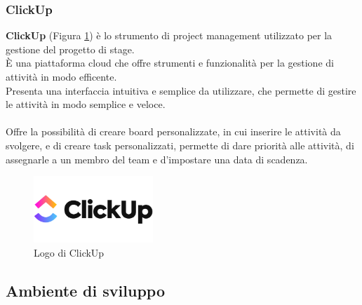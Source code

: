 \subsubsection{ClickUp}   %
\textbf{ClickUp} (Figura \ref{fig:clickup}) è lo strumento di project management utilizzato per la gestione del progetto di stage.\\ 
È una piattaforma cloud che offre strumenti e funzionalità per la gestione di attività in modo efficente.\\
Presenta una interfaccia intuitiva e semplice da utilizzare, che permette di gestire le attività in modo semplice e veloce.\\
\pagebreak
\\
Offre la possibilità di creare \gls{board}{} personalizzate, in cui inserire le attività da svolgere, e di creare \gls{task}{} personalizzati,
permette di dare priorità alle attività, di assegnarle a un membro del team e d'impostare una data di scadenza.\\

\begin{figure}[h]
    \centering
    \includegraphics[width=0.4\textwidth]{images/tecnologie/logo_clickup.png}
    \caption{Logo di ClickUp}
    \label{fig:clickup}
\end{figure}
\subsection{Ambiente di sviluppo}

